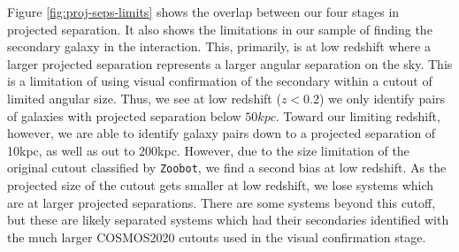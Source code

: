 Figure \ref{fig:proj-seps-limits} shows the overlap between our four stages in projected separation. It also shows the limitations in our sample of finding the secondary galaxy in the interaction. This, primarily, is at low redshift where a larger projected separation represents a larger angular separation on the sky. This is a limitation of using visual confirmation of the secondary within a cutout of limited angular size. Thus, we see at low redshift ($z < 0.2$) we only identify pairs of galaxies with projected separation below $50kpc$. Toward our limiting redshift, however, we are able to identify galaxy pairs down to a projected separation of 10kpc, as well as out to 200kpc. However, due to the size limitation of the original cutout classified by \texttt{Zoobot}, we find a second bias at low redshift. As the projected size of the cutout gets smaller at low redshift, we lose systems which are at larger projected separations. There are some systems beyond this cutoff, but these are likely separated systems which had their secondaries identified with the much larger COSMOS2020 cutouts used in the visual confirmation stage.

